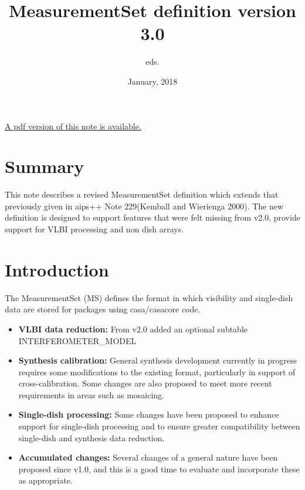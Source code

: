 \documentclass{article}
\begin{document}
\title{MeasurementSet definition version 3.0}
\author{eds.}
\date{January, 2018}
\maketitle

\ifpdf
\else
\href{264.pdf}{A pdf version of this note is available.}
\fi

\tableofcontents 
\section{Summary} 

This note describes a revised MeasurementSet definition which extends
that previously given in aips++ Note 229(Kemball and Wierienga
2000).  The new definition is designed to support features that were felt missing from v2.0, provide support for VLBI processing and non dish arrays.

\section{Introduction}

The MeasurementSet (MS) defines the format in which visibility and
single-dish data are stored for packages using casa/casacore code.


\begin{itemize}

\item{{\bf VLBI data reduction:} From v2.0 added an optional subtable INTERFEROMETER_MODEL}

\item{{\bf Synthesis calibration:} General synthesis development
currently in progress requires some modifications to the existing
format, particularly in support of cross-calibration. Some changes
are also proposed to meet more recent requirements in areas such as mosaicing.}

\item{{\bf Single-dish processing:} Some changes have been proposed to
enhance support for single-dish processing and to ensure greater
compatibility between single-dish and synthesis data reduction.}

\item{{\bf Accumulated changes:} Several changes of a general nature
have been proposed since v1.0, and this is a good time to evaluate
and incorporate these as appropriate.}

\end{itemize}
\end{document}
